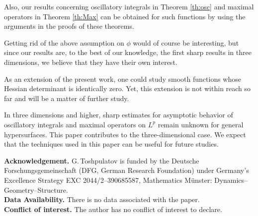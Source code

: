 \documentclass[a4paper, 11pt]{article}
\theoremstyle{plain}
\theoremstyle{definition}
\theoremstyle{lemma}
\theoremstyle{Remark}
\theoremstyle{proposition}
\theoremstyle{corollary}
\theoremstyle{example}
\theoremstyle{assumption}
\begin{document}
 Also, our results concerning oscillatory integrals in Theorem \ref{th:osc}  and maximal operators in Theorem \ref{th:Max} can be obtained for such functions by using the  arguments in the proofs of these theorems.

 \bigskip

Getting rid of the above
assumption on $\phi$ would of course be interesting, but since our results are, to the best of our knowledge, the first sharp results in three dimensions, we believe that they have their own interest.

 As an extension of the present work, one could study smooth functions whose Hessian determinant is identically zero. Yet, this extension is not within reach so far and will be a matter of further study.

 In three dimensions and higher, sharp estimates for asymptotic behavior of oscillatory integrals and  maximal operators on $L^p$ remain unknown for general hypersurfaces. This paper contributes to the  three-dimensional case. We expect that the techniques used in this paper can
be useful for future studies.


\bigskip

\textbf{Acknowledgement.}
 G.\,Toshpulatov is funded  by the Deutsche Forschungsgemeinschaft (DFG, German Research Foundation) under Germany's Excellence Strategy EXC 2044/2--390685587, Mathematics M\"unster: Dynamics--Geometry--Structure.\\



\textbf{Data Availability.} There is no data associated with the paper.\\

\textbf{Conflict of interest.} The author has no conflict of interest to declare.
\end{document}
